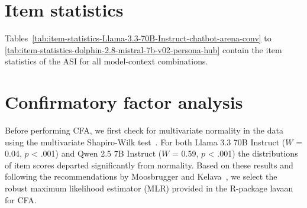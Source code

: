 \documentclass{DESSThesis}
\begin{document}
\clearpage

\section{Item statistics}
\label{app:item-stats}
Tables~\ref{tab:item-statistics-Llama-3.3-70B-Instruct-chatbot-arena-conv} to \ref{tab:item-statistics-dolphin-2.8-mistral-7b-v02-persona-hub} contain the item statistics of the ASI for all model-context combinations. 


























\clearpage

\section{Confirmatory factor analysis}
\label{app:cfa}

Before performing CFA, we first check for multivariate normality in the data using the multivariate Shapiro-Wilk test~\cite{villasenor_alva_generalization_2009}. For both Llama 3.3 70B Instruct ($W$ = 0.04, $p$ < .001) and Qwen 2.5 7B Instruct ($W$ = 0.59, $p$ < .001) the distributions of item scores departed significantly from normality. Based on these results and following the recommendations by Moosbrugger and Kelava~\cite{moosbrugger_testtheorie_2020}, we select the robust maximum likelihood estimator (MLR) provided in the R-package lavaan~\cite{rosseel_lavaan_2012} for CFA.
\end{document}
